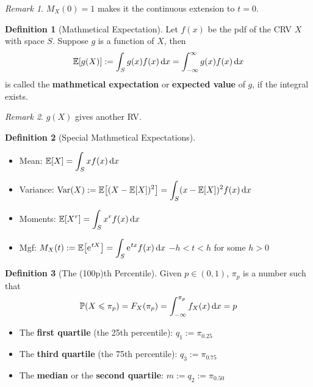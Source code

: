 \documentclass[10pt,UTF8]{article}
\newenvironment{definition box}
{\begin{tcolorbox}[colback=blue!5!white,colframe=blue!75!black,parbox=false,before upper=\par,before lower=\par]}
{\end{tcolorbox}}
\newenvironment{theorem box}
{\begin{tcolorbox}[colback=yellow!5!white,colframe=yellow!75!black,parbox=false,before upper=\par,before lower=\par]}
{\end{tcolorbox}}
\theoremstyle{definition}
\newtheorem{definition inner}{Definition}[section]
\newenvironment{definition}[1][]
{\begin{definition box}\begin{definition inner}[#1]\hfill\par}
{\end{definition inner}\end{definition box}}
\theoremstyle{plain}
\newtheorem{theorem inner}{Theorem}[section]
\theoremstyle{definition}
\newtheorem*{proof inner}{\textit{Proof}}
\theoremstyle{remark}
\newtheorem*{remark}{\textit{Remark}}
\newcommand{\e}{\mathrm{e}{\mkern 1 mu}}
\newcommand{\E}[1]{\mathbb{E}\qty[#1]}  %
\newcommand{\Prob}{\mathbb{P}\qty}
\newcommand{\Var}[1]{\mathrm{Var}\qty(#1)}  %
\begin{document}
\begin{remark}
    $M_X(0)=1$ makes it the continuous extension to $t=0$.
\end{remark}


\begin{definition}[Mathmetical Expectation]
    Let $f(x)$ be the pdf of the CRV $X$ with space $S$.
    Suppose $g$ is a function of $X$, then
    \begin{equation*}
        \E{g(X)} := \int_{S}g(x)f(x)\dd{x}
        = \int_{-\infty}^{\infty}g(x)f(x)\dd{x}
    \end{equation*}
    is called the \textbf{mathmetical expectation}
    or \textbf{expected value} of $g$,
    if the integral exists.
    \begin{remark}
        $g(X)$ gives another RV.
    \end{remark}
\end{definition}


\begin{definition}[Special Mathmetical Expectations]
    \begin{itemize}
        \item Mean: $\displaystyle \E{X} = \int_{S}x f(x)\dd{x}$
        \item Variance: $\displaystyle \Var{X}
        := \E{(X-\E{X})^2} = \int_{S}(x-\E{X})^2 f(x)\dd{x}$
        \item Moments: $\displaystyle \E{X^r} = \int_{S}x^r f(x)\dd{x}$
        \item Mgf: $\displaystyle M_X(t) := \E{\e^{tX}} = \int_{S}\e^{tx}f(x)\dd{x}$
        \qquad $-h<t<h$ for some $h>0$
    \end{itemize}
\end{definition}

\begin{definition}[The (100p)th Percentile]
    Given $p\in(0,1)$, $\pi_p$ is a number such that
    \begin{equation*}
        \Prob(X\leqslant \pi_p) =
        F_X(\pi_p) = \int_{-\infty}^{\pi_p}f_X(x)\dd{x} = p
    \end{equation*}
    \begin{itemize}
        \item The \textbf{first quartile} (the 25th percentile):
            \qquad$q_1 := \pi_{0.25}$
        \item The \textbf{third quartile} (the 75th percentile):
            \qquad$q_3 := \pi_{0.75}$
        \item The \textbf{median} or the \textbf{second quartile}:
            \qquad$m := q_2 := \pi_{0.50}$
    \end{itemize}
\end{definition}
\end{document}
